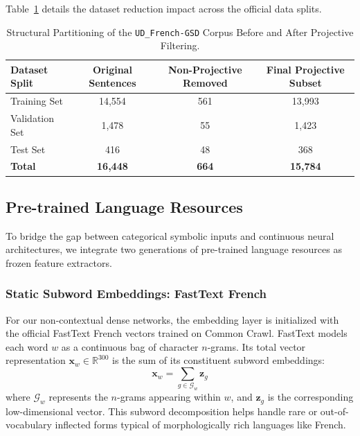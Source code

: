 \documentclass[12pt,a4paper]{article}
\begin{document}
Table~\ref{tab:dataset_filtering_stats} details the dataset reduction impact across the official data splits.

\begin{table}[ht]
\centering
\caption{Structural Partitioning of the \texttt{UD\_French-GSD} Corpus Before and After Projective Filtering.}
\label{tab:dataset_filtering_stats}
\small
\begin{tabular}{lccc}
\hline
\textbf{Dataset Split} & \textbf{Original Sentences} & \textbf{Non-Projective Removed} & \textbf{Final Projective Subset} \\ \hline
Training Set           & 14,554                      & 561                             & 13,993                           \\
Validation Set         & 1,478                       & 55                              & 1,423                            \\
Test Set               & 416                         & 48                              & 368                              \\ \hline
\textbf{Total}         & \textbf{16,448}             & \textbf{664}                    & \textbf{15,784}                  \\ \hline
\end{tabular}
\end{table}

\subsection{Pre-trained Language Resources}
\label{subsec:pretrained_resources}

To bridge the gap between categorical symbolic inputs and continuous neural architectures, we integrate two generations of pre-trained language resources as frozen feature extractors.

\subsubsection{Static Subword Embeddings: FastText French}
For our non-contextual dense networks, the embedding layer is initialized with the official FastText French vectors trained on Common Crawl. FastText models each word $w$ as a continuous bag of character $n$-grams. Its total vector representation $\mathbf{x}_w \in \mathbb{R}^{300}$ is the sum of its constituent subword embeddings:
\begin{equation}
    \mathbf{x}_w = \sum_{g \in \mathcal{G}_w} \mathbf{z}_g
\end{equation}
where $\mathcal{G}_w$ represents the $n$-grams appearing within $w$, and $\mathbf{z}_g$ is the corresponding low-dimensional vector. This subword decomposition helps handle rare or out-of-vocabulary inflected forms typical of morphologically rich languages like French.
\end{document}
